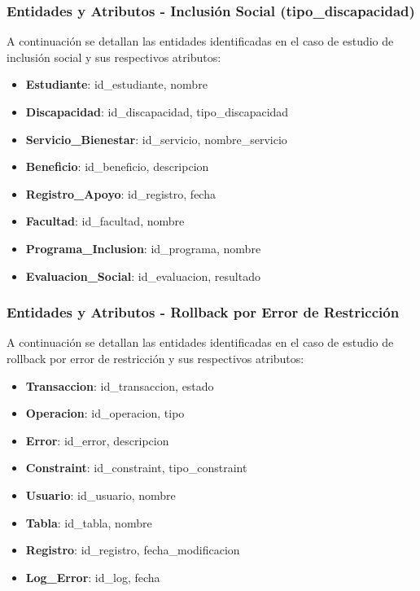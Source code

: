 \documentclass{article}
\begin{document}
\subsubsection{Entidades y Atributos - Inclusión Social (tipo\_discapacidad)}

A continuación se detallan las entidades identificadas en el caso de estudio de inclusión social y sus respectivos atributos:

\begin{itemize}
    \item \textbf{Estudiante}: id\_estudiante, nombre
    \item \textbf{Discapacidad}: id\_discapacidad, tipo\_discapacidad
    \item \textbf{Servicio\_Bienestar}: id\_servicio, nombre\_servicio
    \item \textbf{Beneficio}: id\_beneficio, descripcion
    \item \textbf{Registro\_Apoyo}: id\_registro, fecha
    \item \textbf{Facultad}: id\_facultad, nombre
    \item \textbf{Programa\_Inclusion}: id\_programa, nombre
    \item \textbf{Evaluacion\_Social}: id\_evaluacion, resultado
\end{itemize}

\subsubsection{Entidades y Atributos - Rollback por Error de Restricción}

A continuación se detallan las entidades identificadas en el caso de estudio de rollback por error de restricción y sus respectivos atributos:

\begin{itemize}
    \item \textbf{Transaccion}: id\_transaccion, estado
    \item \textbf{Operacion}: id\_operacion, tipo
    \item \textbf{Error}: id\_error, descripcion
    \item \textbf{Constraint}: id\_constraint, tipo\_constraint
    \item \textbf{Usuario}: id\_usuario, nombre
    \item \textbf{Tabla}: id\_tabla, nombre
    \item \textbf{Registro}: id\_registro, fecha\_modificacion
    \item \textbf{Log\_Error}: id\_log, fecha
\end{itemize}
\end{document}
